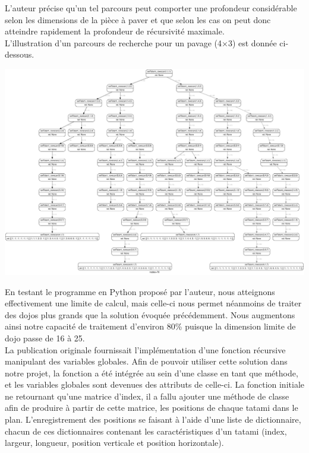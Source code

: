 L’auteur précise qu’un tel parcours peut comporter une profondeur considérable selon les dimensions de la pièce
à paver et que selon les cas on peut donc atteindre rapidement la profondeur de récursivité maximale.\\

L'illustration d'un parcours de recherche pour un pavage (4$\times$3) est donnée ci-dessous.\\

\begin{adjustwidth}{-1.5cm}{0cm}
\includegraphics[width=19cm]{images/arbre4x3.pdf}
\end{adjustwidth}


En testant le programme en Python proposé par l’auteur, nous atteignons effectivement une limite de calcul,
mais celle-ci nous permet néanmoins de traiter des dojos plus grands que la solution évoquée précédemment.
Nous augmentons ainsi notre capacité de traitement d’environ 80\% puisque la dimension limite de dojo passe de 16 à 25.\\

La publication originale fournissait l’implémentation d’une fonction récursive manipulant des variables globales.
Afin de pouvoir utiliser cette solution dans notre projet, la fonction a été intégrée au sein d’une classe en tant que méthode,
et les variables globales sont devenues des attributs de celle-ci. La fonction initiale ne retournant qu’une matrice d’index,
il a fallu ajouter une méthode de classe afin de produire à partir de cette matrice, les positions de chaque tatami dans le plan.
L’enregistrement des positions se faisant à l’aide d’une liste de dictionnaire, chacun de ces dictionnaires contenant
les caractéristiques d’un tatami (index, largeur, longueur, position verticale et position horizontale).



